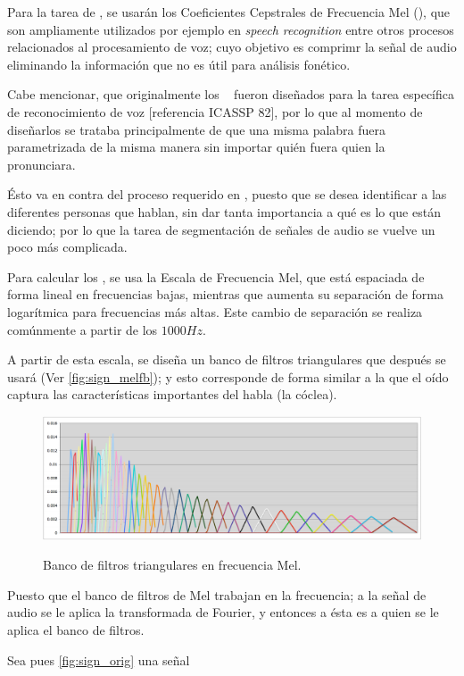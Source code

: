 Para la tarea de \sd, se usarán los Coeficientes Cepstrales de Frecuencia 
Mel (\MFCC), que son ampliamente utilizados por ejemplo en \textit{speech 
recognition} entre otros procesos relacionados al procesamiento de voz; 
cuyo objetivo es comprimr la señal de audio eliminando la información que 
no es útil para análisis fonético.

Cabe mencionar, que originalmente los \MFCC~ fueron diseñados para la tarea
específica de reconocimiento de voz [referencia ICASSP 82], por lo que al 
momento de diseñarlos se trataba principalmente de que una misma palabra 
fuera parametrizada de la misma manera sin importar quién fuera quien la 
pronunciara. 

Ésto va en contra del proceso requerido en \sd, puesto que se desea identificar 
a las diferentes personas que hablan, sin dar tanta importancia a qué es lo 
que están diciendo; por lo que la tarea de segmentación de señales de audio 
se vuelve un poco más complicada.

Para calcular los \MFCC, se usa la Escala de Frecuencia Mel, que está espaciada 
de forma lineal en frecuencias bajas, mientras que aumenta su separación de 
forma logarítmica para frecuencias más altas. Este cambio de separación se 
realiza comúnmente a partir de los $1000Hz$. 

A partir de esta escala, se diseña un banco de filtros triangulares que 
después se usará (Ver \autoref{fig:sign_melfb}); y esto corresponde de forma 
similar a la que el oído captura las características importantes del habla 
(la cóclea). 

\begin{figure}[bth]
        \myfloatalign
        {\includegraphics[width=0.9\linewidth]{gfx/melfb}} \quad
        \caption{Banco de filtros triangulares en frecuencia Mel.}
        \label{fig:sign_melfb}
\end{figure}

Puesto que el banco de filtros de Mel trabajan en la frecuencia; a la señal 
de audio se le aplica la transformada de Fourier, y entonces a ésta es a quien 
se le aplica el banco de filtros.

Sea pues \autoref{fig:sign_orig} una señal 
